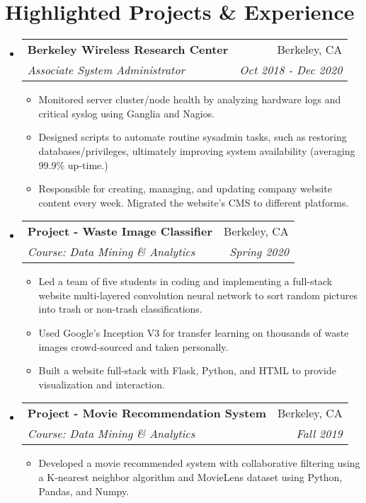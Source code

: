 \documentclass[letterpaper,11pt]{article}
\makeatletter
\newcommand{\resumeSubheading}[4]{
  \vspace{-1pt}\item
    \begin{tabular*}{0.97\textwidth}{l@{\extracolsep{\fill}}r}
      \textbf{#1} & #2 \\
      \textit{\small#3} & \textit{\small #4} \\
    \end{tabular*}\vspace{-5pt}
}
\newcommand{\resumeSubHeadingListStart}{\begin{itemize}[leftmargin=*]}
\newcommand{\resumeSubHeadingListEnd}{\end{itemize}}
\makeatother
\begin{document}
\section{Highlighted Projects \& Experience}
  \resumeSubHeadingListStart
    \resumeSubheading
      {Berkeley Wireless Research Center}{Berkeley, CA}
      {Associate System Administrator}{Oct 2018 - Dec 2020}
      \begin{itemize}
        \item
          {Monitored server cluster/node health by analyzing hardware logs and critical syslog using Ganglia and Nagios.}
        \item
       	 {Designed scripts to automate routine sysadmin tasks, such as restoring databases/privileges, ultimately improving system availability (averaging 99.9\% up-time.)}
        \item
          {Responsible for creating, managing, and updating company website content every week. Migrated the website's CMS to different platforms.}
      \end{itemize}

    \resumeSubheading
		{Project - Waste Image Classifier}{Berkeley, CA}
		{Course: Data Mining \& Analytics}{Spring 2020}
		\begin{itemize}
			\item	{Led a team of five students in coding and implementing a full-stack website multi-layered convolution neural network to sort random pictures into trash or non-trash classifications.}
			\item	{Used Google's Inception V3 for transfer learning on thousands of waste images crowd-sourced and taken personally.}
			\item {Built a website full-stack with Flask, Python, and HTML to provide visualization and interaction.}
		\end{itemize}
	\resumeSubheading
	{Project - Movie Recommendation System}{Berkeley, CA}
	{Course: Data Mining \& Analytics}{Fall 2019}
	\begin{itemize}
		\item	{Developed a movie recommended system with collaborative filtering using a K-nearest neighbor algorithm and MovieLens dataset using Python, Pandas, and Numpy.}
	\end{itemize}
  \resumeSubHeadingListEnd


\end{document}
